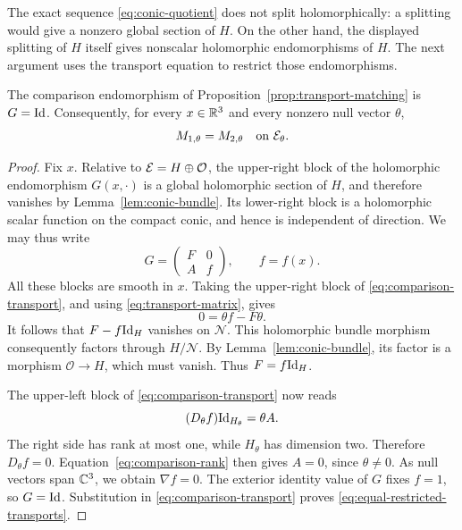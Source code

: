 \begin{remark}
The exact sequence \eqref{eq:conic-quotient} does not split holomorphically:
a splitting would give a nonzero global section of $H$.  On the other
hand, the displayed splitting of $H$ itself gives nonscalar holomorphic
endomorphisms of $H$.  The next argument uses the transport equation to
restrict those endomorphisms.
\end{remark}

\begin{proposition}\label{prop:comparison-rigidity}
The comparison endomorphism of
Proposition~\ref{prop:transport-matching} is $G=\mathrm{Id}$.  Consequently, for
every $x\in\mathbb R^3$ and every nonzero null vector $\theta$,
\begin{equation}\label{eq:equal-restricted-transports}
 M_{1,\theta}=M_{2,\theta}\quad\text{on }\mathcal E_\theta.
\end{equation}
\end{proposition}

\begin{proof}
Fix $x$.  Relative to $\mathcal E=H\oplus\mathcal O$, the upper-right block
of the holomorphic endomorphism $G(x,\cdot)$ is a global holomorphic
section of $H$, and therefore vanishes by Lemma~\ref{lem:conic-bundle}.
Its lower-right block is a holomorphic scalar function on the compact
conic, and hence is independent of direction.  We may thus write
\[
 G=\begin{pmatrix}F&0\\ A&f\end{pmatrix},\qquad f=f(x).
\]
All these blocks are smooth in $x$.  Taking the upper-right block of
\eqref{eq:comparison-transport}, and using
\eqref{eq:transport-matrix}, gives
\[
 0=\theta f-F\theta.
\]
It follows that $F-f\mathrm{Id}_H$ vanishes on $\mathcal N$.  This holomorphic
bundle morphism consequently factors through $H/\mathcal N$.  By
Lemma~\ref{lem:conic-bundle}, its factor is a morphism
$\mathcal O\to H$, which must vanish.  Thus $F=f\mathrm{Id}_H$.

The upper-left block of \eqref{eq:comparison-transport} now reads
\begin{equation}\label{eq:comparison-rank}
 (D_\theta f)\mathrm{Id}_{H_\theta}=\theta A.
\end{equation}
The right side has rank at most one, while $H_\theta$ has dimension two.
Therefore $D_\theta f=0$.  Equation~\eqref{eq:comparison-rank} then gives
$A=0$, since $\theta\ne0$.  As null vectors span $\mathbb C^3$, we obtain
$\nabla f=0$.  The exterior identity value of $G$ fixes $f=1$, so $G=\mathrm{Id}$.
Substitution in \eqref{eq:comparison-transport} proves
\eqref{eq:equal-restricted-transports}.
\end{proof}

